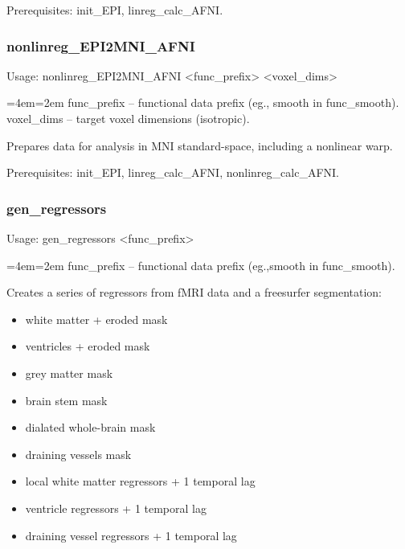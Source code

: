 \documentclass[final,titlepage,letterpaper,oneside,12pt]{article}
\renewcommand{\texttt}[2][BrickRed]{\textcolor{#1}{\ttfamily #2}}%
\newenvironment{blockquote}{%
  \par%
  \medskip
  \leftskip=4em\rightskip=2em%
  \noindent\ignorespaces}{%
  \par\medskip}
\begin{document}
Prerequisites: \texttt{init\_EPI}, \texttt{linreg\_calc\_AFNI}.

\subsubsection{nonlinreg\_EPI2MNI\_AFNI}
Usage: \texttt{nonlinreg\_EPI2MNI\_AFNI <func\_prefix> <voxel\_dims>}

\begin{blockquote}
func\_prefix -- functional data prefix (eg., smooth in func\_smooth). \\
voxel\_dims -- target voxel dimensions (isotropic). \
\end{blockquote}

\noindent Prepares data for analysis in MNI standard-space, including a nonlinear warp.

Prerequisites: \texttt{init\_EPI}, \texttt{linreg\_calc\_AFNI}, \texttt{nonlinreg\_calc\_AFNI}.

\subsubsection{gen\_regressors}
Usage: \texttt{gen\_regressors <func\_prefix>}

\begin{blockquote}
func\_prefix -- functional data prefix (eg.,smooth in func\_smooth).
\end{blockquote}

\noindent Creates a series of regressors from fMRI data and a freesurfer segmentation: 

\begin{itemize} \itemsep-2pt
	\item{white matter + eroded mask}
	\item{ventricles + eroded mask}
	\item{grey matter mask}
	\item{brain stem mask}
	\item{dialated whole-brain mask}
	\item{draining vessels mask}
	\item{local white matter regressors + 1 temporal lag}
	\item{ventricle regressors + 1 temporal lag}
	\item{draining vessel regressors + 1 temporal lag}
\end{itemize}
\end{document}
